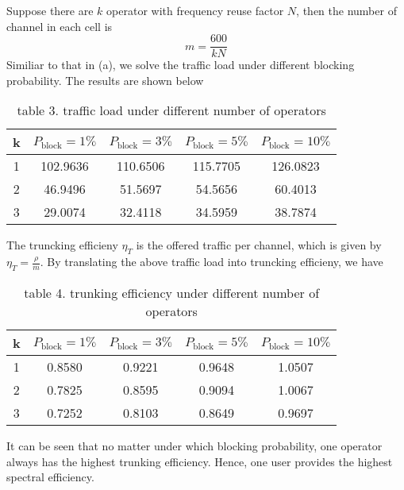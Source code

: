 Suppose there are $k$ operator with frequency reuse factor $N$, then the number of channel in each cell is
\begin{equation*}
    m = \frac{600}{kN}
\end{equation*}
Similiar to that in (a), we solve the traffic load under different blocking probability. The results are shown
below
\begin{table}[H]
    \begin{center}
        \begin{tabular}{|c|c|c|c|c|}
            \hline
            \textbf{k} & \textbf{$P_{\text{block}} = 1\%$} & \textbf{$P_{\text{block}} = 3\%$} & \textbf{$P_{\text{block}} = 5\%$} & \textbf{$P_{\text{block}} = 10\%$} \\
            \hline
            1 & 102.9636 & 110.6506 & 115.7705 & 126.0823 \\
            \hline
            2 & 46.9496  & 51.5697  & 54.5656  & 60.4013 \\
            \hline
            3 & 29.0074  & 32.4118  & 34.5959  & 38.7874 \\
            \hline
        \end{tabular}
        \caption{table 3. traffic load under different number of operators}
    \end{center}
\end{table}
\vspace{-20pt}
The truncking efficieny $\eta_{T}$ is the offered traffic per channel, which is given by $\eta_{T} = \frac{\rho}{m}$.
By translating the above traffic load into truncking efficieny, we have
\begin{table}[H]
    \begin{center}
        \begin{tabular}{|c|c|c|c|c|}
            \hline
            \textbf{k} & \textbf{$P_{\text{block}} = 1\%$} & \textbf{$P_{\text{block}} = 3\%$} & \textbf{$P_{\text{block}} = 5\%$} & \textbf{$P_{\text{block}} = 10\%$} \\
            \hline
            1 & 0.8580 & 0.9221 & 0.9648 & 1.0507 \\
            \hline
            2 & 0.7825 & 0.8595  & 0.9094  & 1.0067 \\
            \hline
            3 & 0.7252 & 0.8103  & 0.8649  & 0.9697 \\
            \hline
        \end{tabular}
        \caption{table 4. trunking efficiency under different number of operators}
    \end{center}
\end{table}
\vspace{-20pt}
It can be seen that no matter under which blocking probability, one operator always has the highest trunking efficiency.
Hence, one user provides the highest spectral efficiency.